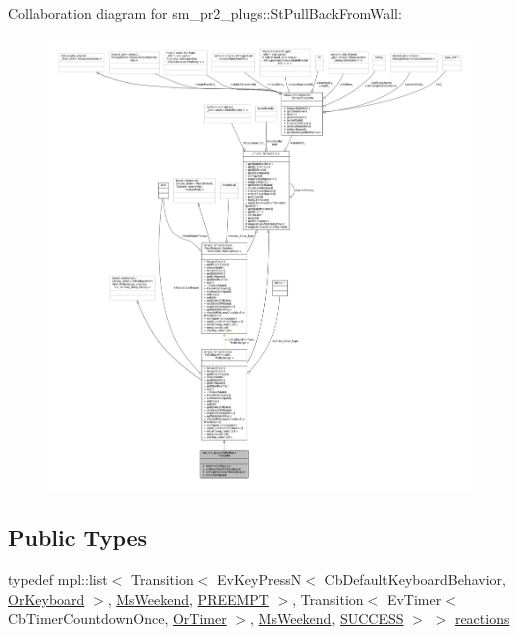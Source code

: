 Collaboration diagram for sm\+\_\+pr2\+\_\+plugs\+:\+:St\+Pull\+Back\+From\+Wall\+:
\nopagebreak
\begin{figure}[H]
\begin{center}
\leavevmode
\includegraphics[width=350pt]{structsm__pr2__plugs_1_1StPullBackFromWall__coll__graph}
\end{center}
\end{figure}
\subsection*{Public Types}
\begin{DoxyCompactItemize}
\item 
typedef mpl\+::list$<$ Transition$<$ Ev\+Key\+PressN$<$ Cb\+Default\+Keyboard\+Behavior, \hyperlink{classsm__pr2__plugs_1_1OrKeyboard}{Or\+Keyboard} $>$, \hyperlink{classsm__pr2__plugs_1_1MsWeekend}{Ms\+Weekend}, \hyperlink{classPREEMPT}{P\+R\+E\+E\+M\+PT} $>$, Transition$<$ Ev\+Timer$<$ Cb\+Timer\+Countdown\+Once, \hyperlink{classsm__pr2__plugs_1_1OrTimer}{Or\+Timer} $>$, \hyperlink{classsm__pr2__plugs_1_1MsWeekend}{Ms\+Weekend}, \hyperlink{classSUCCESS}{S\+U\+C\+C\+E\+SS} $>$ $>$ \hyperlink{structsm__pr2__plugs_1_1StPullBackFromWall_a1270c0eceb6a7c34dc94440623cd9c1a}{reactions}
\end{DoxyCompactItemize}
